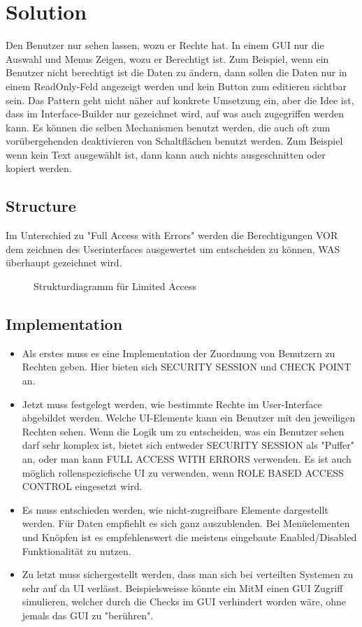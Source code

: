 \section{Solution}
Den Benutzer nur sehen lassen, wozu er Rechte hat. In einem GUI nur die Auswahl und Menus Zeigen, wozu er Berechtigt ist. Zum Beispiel, wenn ein Benutzer nicht berechtigt ist die Daten zu ändern, dann sollen die Daten nur in einem ReadOnly-Feld angezeigt werden und kein Button zum editieren sichtbar sein. Das Pattern geht nicht näher auf konkrete Umsetzung ein, aber die Idee ist, dass im Interface-Builder nur gezeichnet wird, auf was auch zugegriffen werden kann. Es können die selben Mechanismen benutzt werden, die auch oft zum vorübergehenden deaktivieren von Schaltflächen benutzt werden. Zum Beispiel wenn kein Text ausgewählt ist, dann kann auch nichts ausgeschnitten oder kopiert werden.

\subsection{Structure}
Im Unterschied zu "Full Access with Errors" werden die Berechtigungen VOR dem zeichnen des Userinterfaces ausgewertet um entscheiden zu können, WAS überhaupt gezeichnet wird.

\begin{figure}[H]
  \centering
  
  \caption{Strukturdiagramm f\"ur Limited Access}
\end{figure}

\subsection{Implementation}
\begin{itemize}
  \item Als erstes muss es eine Implementation der Zuordnung von Benutzern zu Rechten geben. Hier bieten sich SECURITY SESSION und CHECK POINT an.
  \item Jetzt muss festgelegt werden, wie bestimmte Rechte im User-Interface abgebildet werden. Welche UI-Elemente kann ein Benutzer mit den jeweiligen Rechten sehen. Wenn die Logik um zu entscheiden, was ein Benutzer sehen darf sehr komplex ist, bietet sich entweder SECURITY SESSION als "Puffer" an, oder man kann FULL ACCESS WITH ERRORS verwenden. Es ist auch möglich rollenspeziefische UI zu verwenden, wenn ROLE BASED ACCESS CONTROL eingesetzt wird.
  \item Es muss entschieden werden, wie nicht-zugreifbare Elemente dargestellt werden. Für Daten empfiehlt es sich ganz auszublenden. Bei Menüelementen und Knöpfen ist es empfehlenswert die meistens eingebaute Enabled/Disabled Funktionalität zu nutzen.
  \item Zu letzt muss sichergestellt werden, dass man sich bei verteilten Systemen zu sehr auf da UI verlässt. Beispielsweisse könnte ein MitM einen GUI Zugriff simulieren, welcher durch die Checks im GUI verhindert worden wäre, ohne jemals das GUI zu "berühren".
\end{itemize}

